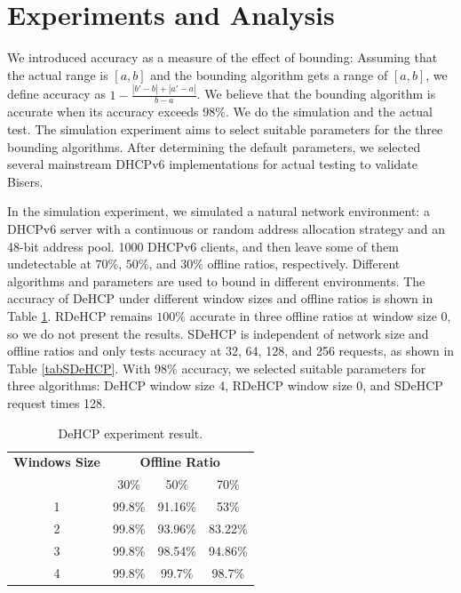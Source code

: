 \documentclass[conference]{IEEEtran}
\begin{document}
\section{Experiments and Analysis}

We introduced accuracy as a measure of the effect of bounding:
Assuming that the actual range is $[a, b]$ and the bounding algorithm
gets a range of $[a, b]$, we define accuracy as
$1-\frac{|b'-b|+|a'-a|}{b-a}$. We believe that the bounding algorithm
is accurate when its accuracy exceeds $98\%$. We do the simulation and
the actual test. The simulation experiment aims to select suitable
parameters for the three bounding algorithms. After determining the
default parameters, we selected several mainstream DHCPv6
implementations for actual testing to validate Bisers.

In the simulation experiment, we simulated a natural network
environment: a DHCPv6 server with a continuous or random address
allocation strategy and an 48-bit address pool. 1000 DHCPv6 clients,
and then leave some of them undetectable at $70\%$, $50\%$, and $30\%$
offline ratios, respectively. Different algorithms and parameters are
used to bound in different environments. The accuracy of DeHCP under
different window sizes and offline ratios is shown in Table
\ref{tabDeHCP}. RDeHCP remains $100\%$ accurate in three offline
ratios at window size 0, so we do not present the results. SDeHCP is
independent of network size and offline ratios and only tests accuracy
at 32, 64, 128, and 256 requests, as shown in Table
\ref{tabSDeHCP}. With $98\%$ accuracy, we selected suitable parameters
for three algorithms: DeHCP window size 4, RDeHCP window size 0, and
SDeHCP request times 128.

\begin{table}[htbp]
  \caption{DeHCP experiment result.}
  \begin{center}
    \centering
    \begin{tabular}{|c|c|c|c|}
      \hline
      \textbf{Windows Size} & \multicolumn{3}{|c|}{\textbf{Offline Ratio}} \\
      \cline{2-4}
                            & 30\% & 50\% & 70\% \\
      \hline
      1 & 99.8\% & 91.16\% & 53\% \\
      2 & 99.8\% & 93.96\% & 83.22\% \\
      3 & 99.8\% & 98.54\% & 94.86\% \\
      4 & 99.8\% & 99.7\% & 98.7\% \\
      \hline
    \end{tabular}
    \label{tabDeHCP}
  \end{center}
\end{table}
\end{document}
